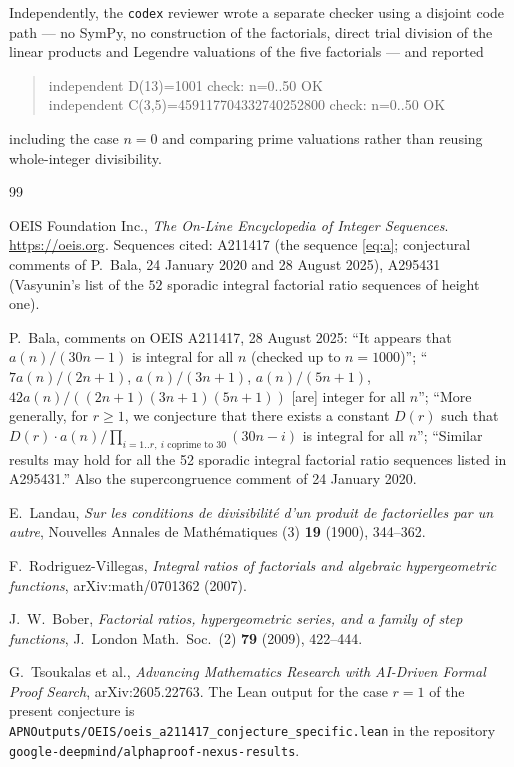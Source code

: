 \documentclass[11pt]{article}
\theoremstyle{plain}
\theoremstyle{definition}
\theoremstyle{remark}
\numberwithin{equation}{section}
\begin{document}
Independently, the \texttt{codex} reviewer wrote a separate checker using a disjoint code path
--- no SymPy, no construction of the factorials, direct trial division of the linear products and
Legendre valuations of the five factorials --- and reported
\begin{quote}\ttfamily\small
independent D(13)=1001 check: n=0..50 OK\\
independent C(3,5)=459117704332740252800 check: n=0..50 OK
\end{quote}
including the case $n=0$ and comparing prime valuations rather than reusing whole-integer
divisibility.

\begin{thebibliography}{99}

OEIS Foundation Inc., \emph{The On-Line Encyclopedia of Integer Sequences}.
\url{https://oeis.org}. Sequences cited: A211417 (the sequence \eqref{eq:a}; conjectural comments
of P.~Bala, 24 January 2020 and 28 August 2025), A295431 (Vasyunin's list of the $52$ sporadic
integral factorial ratio sequences of height one).

P.~Bala, comments on OEIS A211417, 28 August 2025: ``It appears that $a(n)/(30n-1)$ is integral
for all $n$ (checked up to $n=1000$)''; ``$7a(n)/(2n+1)$, $a(n)/(3n+1)$, $a(n)/(5n+1)$,
$42a(n)/((2n+1)(3n+1)(5n+1))$ [are] integer for all $n$''; ``More generally, for $r \ge 1$, we
conjecture that there exists a constant $D(r)$ such that
$D(r)\cdot a(n)/\prod_{i=1..r,\ i \text{ coprime to } 30}(30n-i)$ is integral for all $n$'';
``Similar results may hold for all the 52 sporadic integral factorial ratio sequences listed in
A295431.'' Also the supercongruence comment of 24 January 2020.

E.~Landau, \emph{Sur les conditions de divisibilit\'e d'un produit de factorielles par un autre},
Nouvelles Annales de Math\'ematiques (3) \textbf{19} (1900), 344--362.

F.~Rodriguez-Villegas, \emph{Integral ratios of factorials and algebraic hypergeometric
functions}, arXiv:math/0701362 (2007).

J.~W.~Bober, \emph{Factorial ratios, hypergeometric series, and a family of step functions},
J.~London Math.\ Soc.\ (2) \textbf{79} (2009), 422--444.

G.~Tsoukalas et al., \emph{Advancing Mathematics Research with AI-Driven Formal Proof Search},
arXiv:2605.22763. The Lean output for the case $r=1$ of the present conjecture is
\texttt{APNOutputs/OEIS/oeis\_a211417\_conjecture\_specific.lean} in the repository
\texttt{google-deepmind/alphaproof-nexus-results}.


\end{thebibliography}
\end{document}
